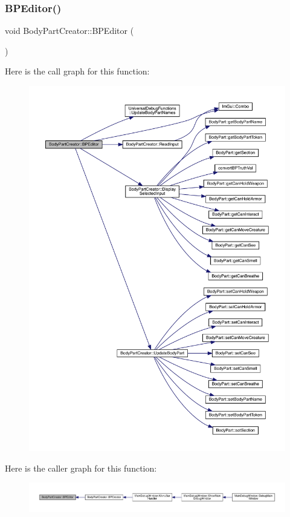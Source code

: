 \subsubsection{\texorpdfstring{B\+P\+Editor()}{BPEditor()}}
{\footnotesize\ttfamily void Body\+Part\+Creator\+::\+B\+P\+Editor (\begin{DoxyParamCaption}{ }\end{DoxyParamCaption})}

Here is the call graph for this function\+:
\nopagebreak
\begin{figure}[H]
\begin{center}
\leavevmode
\includegraphics[width=350pt]{d8/d3a/namespace_body_part_creator_ac18c9ae3935b336efbb9634fb329413f_cgraph}
\end{center}
\end{figure}
Here is the caller graph for this function\+:
\nopagebreak
\begin{figure}[H]
\begin{center}
\leavevmode
\includegraphics[width=350pt]{d8/d3a/namespace_body_part_creator_ac18c9ae3935b336efbb9634fb329413f_icgraph}
\end{center}
\end{figure}
\mbox{\label{namespace_body_part_creator_a1e5297a1d1c20d2867434868cfc42ac1}} 
